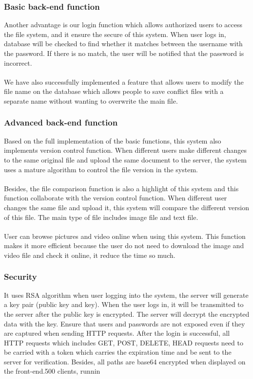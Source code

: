 \documentclass[12pt,a4]{article}
\begin{document}
\subsubsection{Basic back-end function}\label{6.1.2}
Another advantage is our login function which allows authorized users to access the file system, and it ensure the secure of this system. When user logs in, database will be checked to find whether it matches between the username with the password. If there is no match, the user will be notified that the password is incorrect.
\\\\
We have also successfully implemented a feature that allows users to modify the file name on the database which allows people to save conflict files with a separate name without wanting to overwrite the main file.

\subsubsection{Advanced back-end function}\label{6.1.3}
Based on the full implementation of the basic functions, this system also implements version control function. When different users make different changes to the same original file and upload the same document to the server, the system uses a mature algorithm to control the file version in the system.
\\\\
Besides, the file comparison function is also a highlight of this system and this function collaborate with the version control function. When different user changes the same file and upload it, this system will compare the different version of this file. The main type of file includes image file and text file.
\\\\
User can browse pictures and video online when using this system. This function makes it more efficient because the user do not need to download the image and video file and check it online, it reduce the time so much.
\subsubsection{Security}\label{6.1.4}
It uses RSA algorithm when user logging into the system, the server will generate a key pair (public key and key). When the user logs in, it will be transmitted to the server after the public key is encrypted. The server will decrypt the encrypted data with the key. Ensure that users and passwords are not exposed even if they are captured when sending HTTP requests. After the login is successful, all HTTP requests which includes GET, POST, DELETE, HEAD requests need to be carried with a token which carries the expiration time and be sent to the server for verification. Besides, all paths are base64 encrypted when displayed on the front-end.500 clients, runnin
\end{document}
